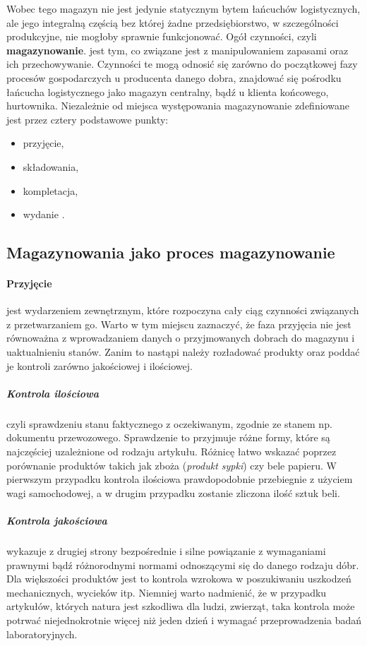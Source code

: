 	Wobec tego magazyn nie jest jedynie statycznym bytem łańcuchów logistycznych, ale jego integralną
	częścią bez której żadne przedsiębiorstwo, w szczególności produkcyjne, nie mogłoby sprawnie
	funkcjonować. Ogół czynności, czyli \textbf{magazynowanie}. jest tym, co związane jest z manipulowaniem
	zapasami oraz ich przechowywanie. Czynności te mogą odnosić się zarówno do początkowej fazy procesów gospodarczych
	u producenta danego dobra, znajdować się pośrodku łańcucha logistycznego jako magazyn centralny, bądź u klienta
	końcowego, hurtownika. Niezależnie od miejsca występowania magazynowanie zdefiniowane jest przez cztery
	podstawowe punkty: 
	\begin{itemize}
		\item przyjęcie,
		\item składowania,
		\item kompletacja,
		\item wydanie \cite{PZMW}\cite{PL_FM}.
	\end{itemize}
	
	\subsection{Magazynowania jako proces magazynowanie}
		\paragraph{Przyjęcie} jest wydarzeniem zewnętrznym, które rozpoczyna cały ciąg czynności 
		związany\-ch z przetwarzaniem go. Warto w tym miejscu zaznaczyć, że faza przyjęcia nie jest 
		równoważna z wprowadzaniem danych o przyjmowanych dobrach do magazynu i uaktualnieniu stanów. 
		Zanim to nastąpi należy rozładować produkty oraz poddać je kontroli zarówno jakościowej i ilościowej.
			\subparagraph{Kontrola ilościowa} czyli sprawdzeniu stanu faktycznego z oczekiwanym, 
			zgodnie ze \-stanem np. dokumentu przewozowego. 
			Sprawdzenie to przyjmuje różne formy, które są najczęściej uzależnione od rodzaju artykułu. 
			Różnicę łatwo wskazać
			poprzez porównanie produktów takich jak zboża (\textit{produkt sypki}) czy bele papieru. 
			W pierwszym przypadku 
			kontrola ilościowa prawdopodobnie przebiegnie z użyciem wagi samochodowej, a w drugim przypadku 
			zostanie zliczona
			ilość sztuk beli.  
			\subparagraph{Kontrola jakościowa} wykazuje z drugiej strony bezpośrednie i silne powiązanie z wymaganiami prawnymi bądź
			różnorodnymi normami odnoszącymi się do danego rodzaju dóbr. Dla większości produktów jest to kontrola
			wzrokowa w poszukiwaniu uszkodzeń mechanicznych, wycieków itp. Niemniej warto nadmienić, że w przypadku
			artykułów, których natura jest szkodliwa dla ludzi, zwierząt, taka kontrola może potrwać niejednokrotnie
			więcej niż jeden dzień i wymagać przeprowadzenia badań laboratoryjnych.
